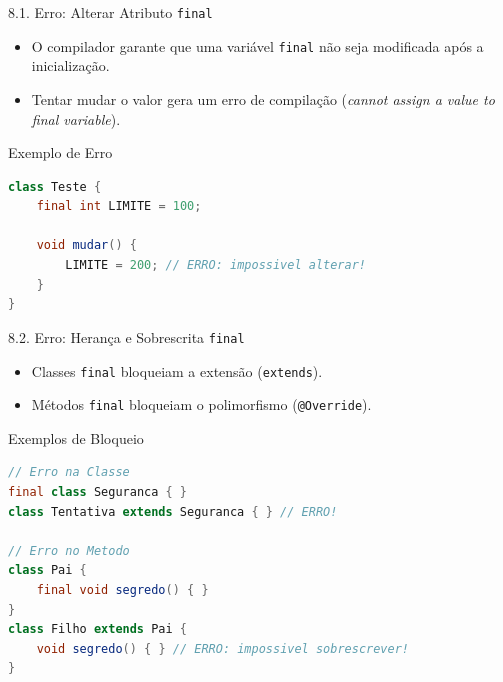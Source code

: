 \documentclass[9pt]{beamer}
\begin{document}
\begin{frame}[fragile]{8.1. Erro: Alterar Atributo \texttt{final}}
    \begin{itemize}
        \item O compilador garante que uma variável \texttt{final} não seja modificada após a inicialização.
        \item Tentar mudar o valor gera um erro de compilação (\textit{cannot assign a value to final variable}).
    \end{itemize}

\begin{block}{Exemplo de Erro}
\begin{lstlisting}[language=Java]
class Teste {
    final int LIMITE = 100;

    void mudar() {
        LIMITE = 200; // ERRO: impossivel alterar!
    }
}
\end{lstlisting}
\end{block}
\end{frame}

\begin{frame}[fragile]{8.2. Erro: Herança e Sobrescrita \texttt{final}}
    \begin{itemize}
        \item Classes \texttt{final} bloqueiam a extensão (\texttt{extends}).
        \item Métodos \texttt{final} bloqueiam o polimorfismo (\texttt{@Override}).
    \end{itemize}

\begin{block}{Exemplos de Bloqueio}
\begin{lstlisting}[language=Java]
// Erro na Classe
final class Seguranca { }
class Tentativa extends Seguranca { } // ERRO!

// Erro no Metodo
class Pai {
    final void segredo() { }
}
class Filho extends Pai {
    void segredo() { } // ERRO: impossivel sobrescrever!
}
\end{lstlisting}
\end{block}
\end{frame}
\end{document}
